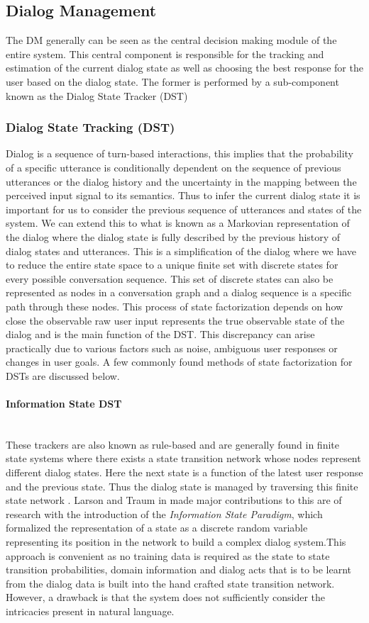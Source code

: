 \documentclass[14pt]{extarticle}
\newcommand{\myparagraph}[1]{\paragraph{#1}\mbox{}\\ \linebreak}
\numberwithin{equation}{section}
\begin{document}
	\subsection{Dialog Management}
	The DM generally can be seen as the central decision making module of the entire system. This central component is responsible for the tracking and estimation of the current dialog state as well as choosing the best response for the user based on the dialog state. The former is performed by a sub-component known as the Dialog State Tracker (DST)
	\subsubsection{Dialog State Tracking (DST)}
	Dialog is a sequence of turn-based interactions, this implies that the probability of a specific utterance is conditionally dependent on the sequence of previous utterances or the dialog history and the uncertainty in the mapping between the perceived input signal to its semantics. Thus to infer the current dialog state it is important for us to consider the previous sequence of utterances and states of the system. We can extend this to what is known as a Markovian representation of the dialog \cite{mdp-bellmann}\cite{mdp-pieraccini} where the dialog state is fully described by the previous history of dialog states and utterances. This is a simplification of the dialog where we have to reduce the entire state space to a unique finite set with discrete states for every possible conversation sequence. This set of discrete states can also be represented as nodes in a conversation graph and a dialog sequence is a specific path through these nodes. This process of state factorization depends on how close the observable raw user input represents the true observable state of the dialog and is the main function of the DST. This discrepancy can arise practically due to various factors such as noise, ambiguous user responses or changes in user goals. A few commonly found methods of state factorization for DSTs are discussed below.
	\myparagraph{Information State DST}
	These trackers are also known as rule-based and are generally found in finite state systems where there exists a state transition network whose nodes represent different dialog states. Here the next state is a function of the latest user response and the previous state. Thus the dialog state is managed by traversing this finite state network \cite{Sutton-introRL}. Larson and Traum in \cite{Larsson:2000:ISD:973935.973943} made major contributions to this are of research with the introduction of the \textit{Information State Paradigm}, which formalized the representation of a state as a discrete random variable representing its position in the network to build a complex dialog system.This approach is convenient as no training data is required as the state to state transition probabilities, domain information and dialog acts that is to be learnt from the dialog data is built into the hand crafted state transition network. However, a drawback is that the system does not sufficiently consider the intricacies present in natural language.
\end{document}
